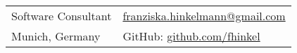 \documentclass[10pt]{article}
\newcommand{\makeheading}[1]%
          {\hspace*{-\marginparsep minus \marginparwidth}%
           \begin{minipage}[t]{\textwidth+\marginparwidth+\marginparsep}%
                  {\large \bfseries #1}\\[-0.15\baselineskip]%
                   \rule{\columnwidth}{1pt}%
           \end{minipage}}
\begin{document}
  \newlength{\rcollength}\setlength{\rcollength}{2.5in}%
  \begin{tabular}[t]{@{}p{\textwidth-\rcollength}p{\rcollength}}
  Software Consultant & 
  	\href{mailto:franziska.hinkelmann@gmail.com}{franziska.hinkelmann@gmail.com}\\
  Munich, Germany
  & 

  	GitHub: \href{https://github.com/fhinkel}{github.com/fhinkel}
  \end{tabular}\\

  \begin{tabular*}{\textwidth}{c}
  \hline
  \end{tabular*}

\end{document}
